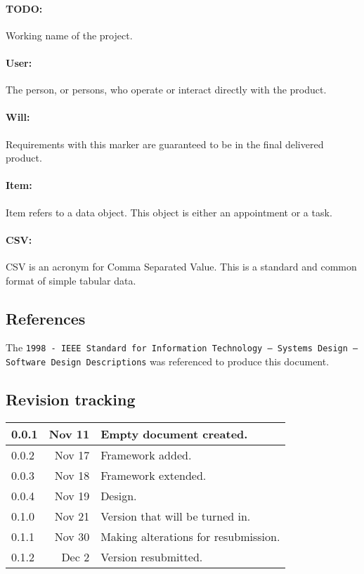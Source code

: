\documentclass[12pt]{article}
\begin{document}
\paragraph{TODO:} Working name of the project.
\paragraph{User:} The person, or persons, who operate or interact directly with the product.
\paragraph{Will:} Requirements with this marker are guaranteed to be in the final delivered product.
\paragraph{Item:} Item refers to a data object. This object is either an appointment or a task.
\paragraph{CSV:} CSV is an acronym for Comma Separated Value. This is a standard and common format of simple tabular data.

\subsection{References}
The {\tt 1998 - IEEE Standard for Information Technology -- Systems Design -- Software Design Descriptions} was referenced to produce this document.

\subsection{Revision tracking}
\begin{tabular}{|l|r|p{4.6in}|}
\hline
0.0.1 & Nov 11 & Empty document created.\\
\hline
0.0.2 & Nov 17 & Framework added.\\
\hline
0.0.3 & Nov 18 & Framework extended.\\
\hline
0.0.4 & Nov 19 & Design.\\
\hline
0.1.0 & Nov 21 & Version that will be turned in.\\
\hline
0.1.1 & Nov 30 & Making alterations for resubmission.\\
\hline
0.1.2 & Dec 2 & Version resubmitted.\\
\hline
\end{tabular}
\end{document}
